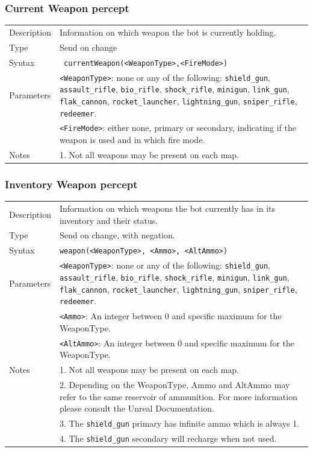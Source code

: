 \documentclass[11pt,a4paper]{article}
\begin{document}
\subsubsection*{Current Weapon percept}
\begin{small}
\begin{tabular}{p{2cm}p{9cm}}
Description & Information on which weapon the bot is currently holding.\\
Type & Send on change \\
Syntax & \verb| currentWeapon(<WeaponType>,<FireMode>)|\\
Parameters &
\verb|<WeaponType>|: none or any of the following: \verb|shield_gun|, \verb|assault_rifle|, \verb|bio_rifle|, \verb|shock_rifle|, \verb|minigun|, \verb|link_gun|, \verb|flak_cannon|, \verb|rocket_launcher|, \verb|lightning_gun|, \verb|sniper_rifle|, \verb|redeemer|.\\
& \verb|<FireMode>|: either none, primary or secondary, indicating if the weapon is used and in which fire mode.\\
Notes & 
	1.	Not all weapons may be present on each map. 
\end{tabular}
\end{small}
	
\subsubsection*{Inventory Weapon percept}
\begin{small}
\begin{tabular}{p{2cm}p{9cm}}
Description & Information on which weapons the bot currently has in its inventory and their status.\\
Type & Send on change, with negation.\\
Syntax & \verb|weapon(<WeaponType>, <Ammo>, <AltAmmo>)|\\
Parameters & 
\verb|<WeaponType>|: none or any of the following: \verb|shield_gun|, \verb|assault_rifle|, \verb|bio_rifle|, \verb|shock_rifle|, \verb|minigun|, \verb|link_gun|, \verb|flak_cannon|, \verb|rocket_launcher|, \verb|lightning_gun|, \verb|sniper_rifle|, \verb|redeemer|.\\
 & \verb|<Ammo>|: An integer between 0 and specific maximum for the WeaponType.\\
 & \verb|<AltAmmo>|: An integer between 0 and specific maximum for the WeaponType.\\
Notes & 
	1.	Not all weapons may be present on each map. \\
&	2.	Depending on the WeaponType, Ammo and AltAmmo may refer to the same reservoir of ammunition. For more information please consult the Unreal Documentation.\\
&	3.	The \verb|shield_gun| primary has infinite ammo which is always 1. \\
& 	4.  	The \verb|shield_gun| secondary will recharge when not used.
\end{tabular}
\end{small}
\end{document}
